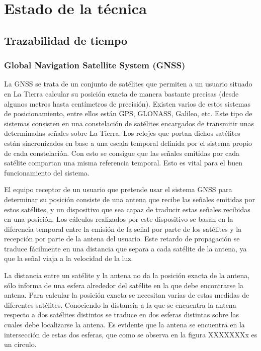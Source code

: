 \chapter{Estado de la técnica}
\section{Trazabilidad de tiempo}
\subsection{Global Navigation Satellite System (GNSS)}
La GNSS se trata de un conjunto de satélites que permiten a un usuario situado en La Tierra calcular su posición exacta de manera bastante precisas (desde algunos metros hasta centímetros de precisión). Existen varios de estos sistemas de posicionamiento, entre ellos están GPS, GLONASS, Galileo, etc. Este tipo de sistemas consisten en una constelación de satélites encargados de transmitir unas determinadas señales sobre La Tierra. Los relojes que portan dichos satélites están sincronizados en base a una escala temporal definida por el sistema propio de cada constelación. Con esto se consigue que las señales emitidas por cada satélite compartan una misma referencia temporal. Esto es vital para el buen funcionamiento del sistema. \newline

El equipo receptor de un usuario que pretende usar el sistema GNSS para determinar su posición consiste de una antena que recibe las señales emitidas por estos satélites, y un dispositivo que sea capaz de traducir estas señales recibidas en una posición. Los cálculos realizados por este dispositivo se basan en la diferencia temporal entre la emisión de la señal por parte de los satélites y la recepción por parte de la antena del usuario. Este retardo de propagación se traduce fácilmente en una distancia que separa a cada satélite de la antena, ya que la señal viaja a la velocidad de la luz. \newline

La distancia entre un satélite y la antena no da la posición exacta de la antena, sólo informa de una esfera alrededor del satélite en la que debe encontrarse la antena. Para calcular la posición exacta se necesitan varias de estas medidas de diferentes satélites. Conociendo la distancia a la que se encuentra la antena respecto a dos satélites distintos se traduce en dos esferas distintas sobre las cuales debe localizarse la antena. Es evidente que la antena se encuentra en la intersección de estas dos esferas, que como se observa en la figura XXXXXXXx es un círculo.

